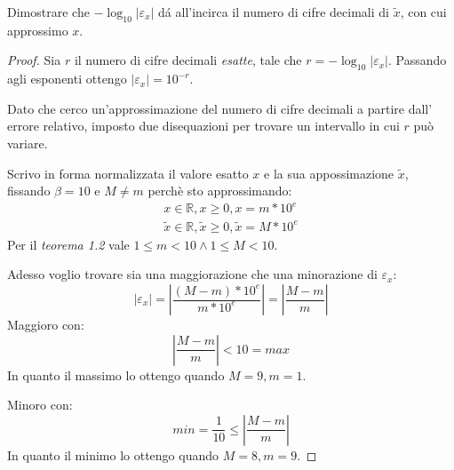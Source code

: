 \begin{exercise}
Dimostrare che $-\log_{10}{|\varepsilon_{x}|}$ d\'a all'incirca il numero 
di cifre decimali di $\tilde{x}$, con cui approssimo $x$. 
\end{exercise}
\begin{proof}
Sia $r$ il numero di cifre decimali \emph{esatte}, tale che 
$r = -\log_{10}{|\varepsilon_{x}|}$. Passando agli esponenti ottengo 
$|\varepsilon_{x}| = 10^{-r}$.

Dato che cerco un'approssimazione del numero di cifre decimali a partire dall'
errore relativo, imposto due disequazioni per trovare un intervallo in cui $r$
pu\`o variare.

Scrivo in forma normalizzata il valore esatto $x$ e la sua appossimazione 
$\tilde{x}$, fissando $\beta = 10$ e $M \not = m$ perch\`e sto approssimando:
\begin{equation*}
	\begin{split}
		x \in \mathbb{R}, x \geq 0, x = m*10^{e} \\
		\tilde{x} \in \mathbb{R}, \tilde{x} \geq 0, \tilde{x} = M*10^{e}
	\end{split}
\end{equation*}
Per il \emph{teorema 1.2} vale $ 1 \leq m < 10 \wedge  1 \leq M < 10$.

Adesso voglio trovare sia una maggiorazione che una minorazione di 
$\varepsilon_{x}$:
\begin{equation*}
	\left | \varepsilon_{x} \right | = \left | \frac{(M - m) * 10^{e}} 
		{m*10^{e}}
	\right | = \left | \frac{M - m}{m} \right |
\end{equation*}
Maggioro con:
\begin{equation*}
	\left | \frac{M - m}{m} \right | < 10 = max
\end{equation*}
In quanto il massimo lo ottengo quando $M = 9, m = 1$.

Minoro con:
\begin{equation*}
	min = \frac{1}{10} \le \left | \frac{M - m}{m} \right | 
\end{equation*}
In quanto il minimo lo ottengo quando $M = 8, m = 9$.


\end{proof}

